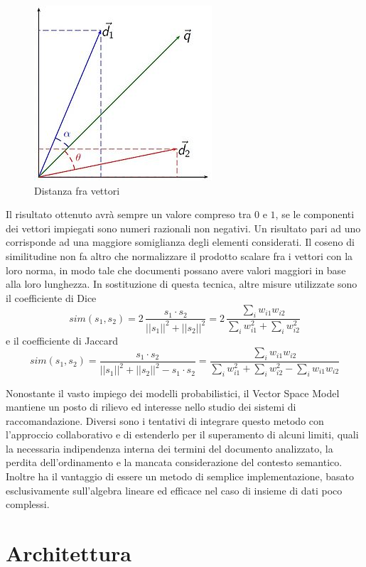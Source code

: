 \documentclass[Lau,binding=0.6cm,noexaminfo,oneside]{sapthesis}
\begin{document}
\begin{figure}[!ht]
  \centering
  \includegraphics[scale=0.9]{vsm.jpg}
  \caption{Distanza fra vettori}
\end{figure}

Il risultato ottenuto avrà sempre un valore compreso tra $0$ e $1$, se le componenti dei vettori impiegati sono numeri razionali non negativi. Un risultato pari ad uno corrisponde ad una maggiore somiglianza degli elementi considerati. Il coseno di similitudine non fa altro che normalizzare il prodotto scalare fra i vettori con la loro norma, in modo tale che documenti possano avere valori maggiori in base alla loro lunghezza. In sostituzione di questa tecnica, altre misure utilizzate sono il coefficiente di Dice
\[
sim(s_1, s_2) = 2 \, \frac{s_1 \cdot s_2}{||s_1||^2 + ||s_2||^2} = 2 \, \frac{\sum_{i} w_{i1} w_{i2}}{\sum_{i} w_{i1}^2 + \sum_{i} w_{i2}^2}
\]
e il coefficiente di Jaccard
\[
sim(s_1, s_2) = \frac{s_1 \cdot s_2}{||s_1||^2 + ||s_2||^2 - s_1 \cdot s_2} = \frac{\sum_{i} w_{i1} w_{i2}}{\sum_{i} w_{i1}^2 + \sum_{i} w_{i2}^2 - \sum_{i} w_{i1} w_{i2}}
\]

\medskip

Nonostante il vasto impiego dei modelli probabilistici, il Vector Space Model mantiene un posto di rilievo ed interesse nello studio dei sistemi di raccomandazione. Diversi sono i tentativi di integrare questo metodo con l'approccio collaborativo e di estenderlo per il superamento di alcuni limiti, quali la necessaria indipendenza interna dei termini del documento analizzato, la perdita dell'ordinamento e la mancata considerazione del contesto semantico. Inoltre ha il vantaggio di essere un metodo di semplice implementazione, basato esclusivamente sull'algebra lineare ed efficace nel caso di insieme di dati poco complessi.

\chapter{Architettura}
\end{document}
